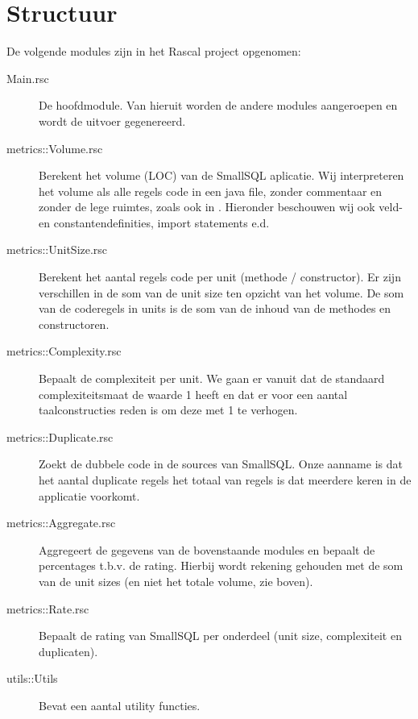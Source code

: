 \documentclass[a4paper]{article}
\begin{document}
\section{Structuur}
\label{sec:Structuur}
De volgende modules zijn in het Rascal project opgenomen:
\begin{description}
\item[Main.rsc] De hoofdmodule. Van hieruit worden de andere modules aangeroepen en wordt de uitvoer gegenereerd.
\item[metrics::Volume.rsc] Berekent het volume (LOC) van de SmallSQL aplicatie. Wij interpreteren het volume als alle regels code in een java file, zonder commentaar en zonder de lege ruimtes, zoals ook in \cite{A}. Hieronder beschouwen wij ook veld- en constantendefinities, import statements e.d.
\item[metrics::UnitSize.rsc] Berekent het aantal regels code per unit (methode / constructor). Er zijn verschillen in de som van de unit size ten opzicht van het volume. De som van de coderegels in units is de som van de inhoud van de methodes en constructoren.
\item[metrics::Complexity.rsc] Bepaalt de complexiteit per unit. We gaan er vanuit dat de standaard complexiteitsmaat de waarde 1 heeft en dat er voor een aantal taalconstructies reden is om deze met 1 te verhogen.
\item[metrics::Duplicate.rsc] Zoekt de dubbele code in de sources van SmallSQL. Onze aanname is dat het aantal duplicate regels het totaal van regels is dat meerdere keren in de applicatie voorkomt.
\item[metrics::Aggregate.rsc] Aggregeert de gegevens van de bovenstaande modules en bepaalt de percentages t.b.v. de rating. Hierbij wordt rekening gehouden met de som van de unit sizes (en niet het totale volume, zie boven).
\item[metrics::Rate.rsc] Bepaalt de rating van SmallSQL per onderdeel (unit size, complexiteit en duplicaten).
\item[utils::Utils] Bevat een aantal utility functies.
\end{description}
\end{document}
